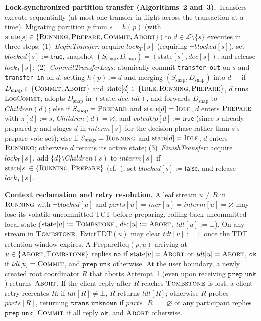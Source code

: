 \documentclass[sigconf,nonacm]{acmart}
\newcommand{\stIdle}{\textsc{Idle}}
\newcommand{\stRun}{\textsc{Running}}
\newcommand{\stPrep}{\textsc{Prepare}}
\newcommand{\stCom}{\textsc{Commit}}
\newcommand{\stAbt}{\textsc{Abort}}
\newcommand{\stTomb}{\textsc{Tombstone}}
\newcommand{\Children}{\mathit{Children}}
\newcommand{\parts}{\mathit{parts}}
\newcommand{\incr}{\mathit{incr}}
\newcommand{\interm}{\mathit{interm}}
\newcommand{\tdt}{\mathit{tdt}}
\newcommand{\dec}{\mathit{dec}}
\newcommand{\blocked}{\mathit{blocked}}
\begin{document}
\textbf{Lock-synchronized partition transfer (Algorithms~2 and~3).}
Transfers execute sequentially (at most one transfer in flight across the
transaction at a time). Migrating partition \(p\) from \(s = h(p)\) (with
\(\mathrm{state}[s] \in \{\stRun,\allowbreak \stPrep,\allowbreak
\stCom,\allowbreak \stAbt\}\)) to \(d \in \mathcal{L} \setminus \{s\}\)
executes in three steps:
(1)~\emph{BeginTransfer:} acquire \(\mathit{lock}_T[s]\) (requiring
\(\neg\blocked[s]\)), set \(\blocked[s] := \mathsf{true}\), snapshot
\((S_{\mathrm{snap}}, D_{\mathrm{snap}}) = (\mathrm{state}[s], \dec[s])\),
and release \(\mathit{lock}_T[s]\);
(2)~\emph{CommitTransferLogs:} atomically commit \texttt{transfer-out} on
\(s\) and \texttt{transfer-in} on \(d\), setting \(h(p) := d\) and merging
\((S_{\mathrm{snap}}, D_{\mathrm{snap}})\) into \(d\)~\cite[\S5.3]{tree2pc}---if
\(D_{\mathrm{snap}} \in \{\stCom,\allowbreak \stAbt\}\) and
\(\mathrm{state}[d] \in \{\stIdle,\allowbreak \stRun,\allowbreak \stPrep\}\),
\(d\) runs \textsc{LogCommit}, adopts \(D_{\mathrm{snap}}\) in
\((\mathrm{state}, \dec, \tdt)\), and forwards \(D_{\mathrm{snap}}\) to
\(\Children(d)\); else if \(S_{\mathrm{snap}} = \stPrep\) and
\(\mathrm{state}[d] = \stIdle\), \(d\) enters \(\stPrep\) with
\(\pi[d] := s\), \(\Children(d) = \varnothing\), and \(\mathit{votedUp}[d] :=
\mathsf{true}\) (since \(s\) already prepared \(p\) and stages \(d\) in
\(\interm[s]\) for the decision phase rather than \(s\)'s prepare vote set);
else if \(S_{\mathrm{snap}} = \stRun\) and \(\mathrm{state}[d] = \stIdle\),
\(d\) enters \(\stRun\); otherwise \(d\) retains its active state;
(3)~\emph{FinishTransfer:} acquire \(\mathit{lock}_T[s]\), add
\(\{d\} \setminus \Children(s)\) to \(\interm[s]\) if \(\mathrm{state}[s]
\in \{\stRun,\allowbreak \stPrep\}\) (cf.~\cite[Alg.~1, lines 3, 6,
9]{tree2pc}), set \(\blocked[s] := \mathsf{false}\), and release
\(\mathit{lock}_T[s]\).

\textbf{Context reclamation and retry resolution.}
A leaf stream \(u \neq R\) in \(\stRun\) with \(\neg\blocked[u]\) and
\(\parts[u] = \incr[u] = \interm[u] = \varnothing\) may lose its volatile
uncommitted \(\mathrm{TCT}\) before preparing, rolling back uncommitted
local state (\(\mathrm{state}[u] := \stTomb\), \(\dec[u] := \stAbt\),
\(\tdt[u] := \bot\)). On any stream in \(\stTomb\), \(\mathrm{EvictTDT}(u)\)
may clear \(\tdt[u] := \bot\) once the \(\mathrm{TDT}\) retention window
expires. A \(\mathrm{PrepareReq}(p, u)\) arriving at \(u \in
\{\stAbt,\allowbreak \stTomb\}\) replies \(\mathtt{no}\) if
\(\mathrm{state}[u] = \stAbt\) or \(\tdt[u] = \stAbt\), \(\mathtt{ok}\) if
\(\tdt[u] = \stCom\), and \(\mathtt{prep\_unk}\) otherwise. At the user
boundary, a newly created root coordinator \(R\) that aborts Attempt~1 (even
upon receiving \(\mathtt{prep\_unk}\)) returns \(\stAbt\). If the client
reply after \(R\) reaches \(\stTomb\) is lost, a client retry recreates
\(R\): if \(\tdt[R] \neq \bot\), \(R\) returns \(\tdt[R]\); otherwise \(R\)
probes \(\parts[R]\), returning \(\mathtt{trans\_unknown}\) if \(\parts[R] =
\varnothing\) or any participant replies \(\mathtt{prep\_unk}\), \(\stCom\)
if all reply \(\mathtt{ok}\), and \(\stAbt\) otherwise.
\end{document}
